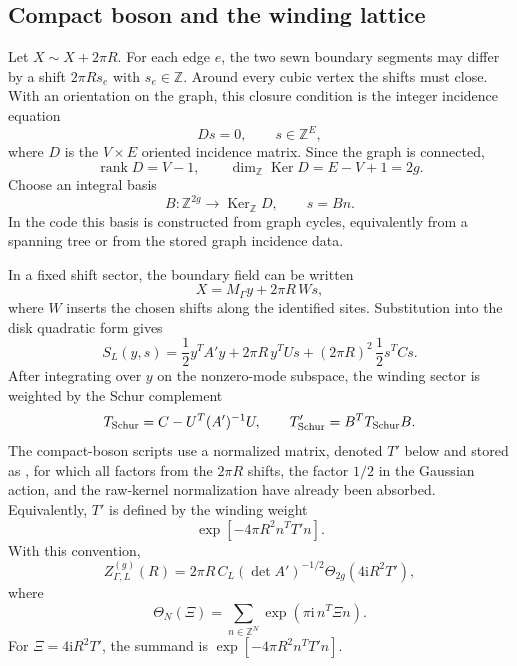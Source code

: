 \documentclass[11pt]{article}
\numberwithin{equation}{section}
\newcommand{\bZ}{\mathbb Z}
\newcommand{\ii}{\mathrm i}
\newcommand{\rank}{\operatorname{rank}}
\newcommand{\Ker}{\operatorname{Ker}}
\begin{document}
\subsection{Compact boson and the winding lattice}
\label{sec:compact}

Let \(X\sim X+2\pi R\).  For each edge \(e\), the two sewn boundary segments
may differ by a shift \(2\pi R s_e\) with \(s_e\in\bZ\).  Around every cubic
vertex the shifts must close.  With an orientation on the graph, this closure
condition is the integer incidence equation
\begin{equation}
        D s=0,\qquad s\in\bZ^E,
        \label{eq:incidence}
\end{equation}
where \(D\) is the \(V\times E\) oriented incidence matrix.  Since the graph is
connected,
\[
        \rank D=V-1,
        \qquad
        \dim_{\bZ}\Ker D=E-V+1=2g.
\]
Choose an integral basis
\begin{equation}
        B:\bZ^{2g}\longrightarrow \Ker_{\bZ}D,\qquad s=Bn.
        \label{eq:windingbasis}
\end{equation}
In the code this basis is constructed from graph cycles, equivalently from a
spanning tree or from the stored graph incidence data.

In a fixed shift sector, the boundary field can be written
\begin{equation}
        X=M_{\Gamma}y+2\pi R\,W s,
        \label{eq:compactaffine}
\end{equation}
where \(W\) inserts the chosen shifts along the identified sites.  Substitution
into the disk quadratic form gives
\begin{equation}
        S_L(y,s)
        =
        \frac{1}{2}y^TA'y
        +2\pi R\,y^TU s
        +(2\pi R)^2\,\frac{1}{2}s^TCs.
\end{equation}
After integrating over \(y\) on the nonzero-mode subspace, the winding sector
is weighted by the Schur complement
\begin{equation}
        T_{\rm Schur}=C-U^T(A')^{-1}U,\qquad
        T'_{\rm Schur}=B^TT_{\rm Schur}B.
        \label{eq:Tprime}
\end{equation}
The compact-boson scripts use a normalized matrix, denoted \(T'\) below and
stored as , for which all factors from the \(2\pi R\) shifts,
the factor \(1/2\) in the Gaussian action, and the raw-kernel normalization have
already been absorbed.  Equivalently, \(T'\) is defined by the winding weight
\[
        \exp[-4\pi R^2 n^TT'n].
\]
With this convention,
\begin{equation}
        Z^{(g)}_{\Gamma,L}(R)
        =
        2\pi R\,C_L(\det A')^{-1/2}
        \Theta_{2g}(4\ii R^2T'),
        \label{eq:compactlattice}
\end{equation}
where
\begin{equation}
        \Theta_N(\Xi)
        =
        \sum_{n\in\bZ^N}
        \exp\left(\pi\ii\,n^T\Xi n\right).
\end{equation}
For \(\Xi=4\ii R^2T'\), the summand is
\(\exp[-4\pi R^2 n^TT'n]\).
\end{document}
